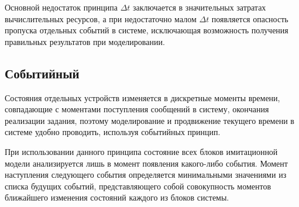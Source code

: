 Основной недостаток принципа $\Delta t$ заключается в значительных затратах вычислительных ресурсов, а при недостаточно малом $\Delta t$ появляется опасность пропуска отдельных событий в системе, исключающая возможность получения правильных результатов при моделировании.

\subsection{Событийный}

Состояния отдельных устройств изменяется в дискретные моменты времени, совпадающие с моментами поступления сообщений в систему, окончания реализации задания, поэтому моделирование и продвижение текущего времени в системе удобно проводить, используя событийных принцип.

При использовании данного принципа состояние всех блоков имитационной модели анализируется лишь в момент появления какого-либо события.
Момент наступления следующего события определяется минимальными значениями из списка будущих событий, представляющего собой совокупность моментов ближайшего изменения состояний каждого из блоков системы.
